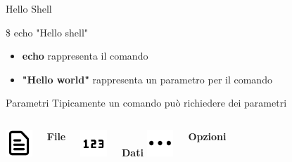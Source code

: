 \documentclass{beamer}
\begin{document}
    \begin{frame}{Hello Shell}
        \begin{exampleblock}{}
            \$ echo "Hello shell" 
        \end{exampleblock}

        \begin{itemize}
            \item \textbf{echo} rappresenta il comando
            \item \textbf{"Hello world"} rappresenta un parametro per il comando
        \end{itemize}

        \begin{block}{Parametri}
            Tipicamente un comando può richiedere dei parametri
            
            \vspace{0.5cm}

            \begin{columns}[t, onlytextwidth]
                    \centering
                    \includegraphics[height=1cm, keepaspectratio]{images/file.pdf}
                    
                    \textbf{File}
    
                    \centering
                    \includegraphics[height=1cm, keepaspectratio]{images/input-data.pdf}
                    
                    \textbf{Dati}
                    \centering
                    \includegraphics[height=1cm, keepaspectratio]{images/options.pdf}
                    
                    \textbf{Opzioni}
            \end{columns}

            \vspace{0.5cm}
        \end{block}
    \end{frame}
\end{document}
